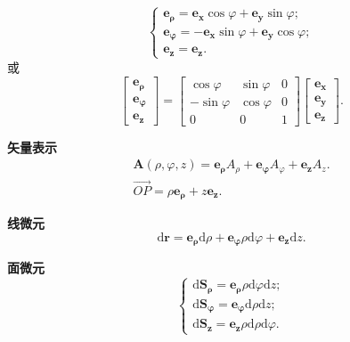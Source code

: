 \begin{equation}
    \begin{cases}
        \bm{e_\rho}=\bm{e_x}\cos\varphi+\bm{e_y}\sin\varphi;     \\
        \bm{e_\varphi}=-\bm{e_x}\sin\varphi+\bm{e_y}\cos\varphi; \\
        \bm{e_z}=\bm{e_z}.
    \end{cases}
\end{equation}
或
\begin{equation}
    \begin{bmatrix}
        \bm{e_\rho}    \\
        \bm{e_\varphi} \\
        \bm{e_z}
    \end{bmatrix}=\begin{bmatrix}
        \cos\varphi  & \sin\varphi & 0 \\
        -\sin\varphi & \cos\varphi & 0 \\
        0            & 0           & 1
    \end{bmatrix}\begin{bmatrix}
        \bm{e_x} \\
        \bm{e_y} \\
        \bm{e_z}
    \end{bmatrix}.
\end{equation}

\textbf{矢量表示}
\begin{gather}
    \bm{A}(\rho, \varphi, z)=\bm{e_\rho}A_\rho+\bm{e_\varphi}A_\varphi+\bm{e_z}A_z. \\
    \overrightarrow{OP}=\rho\bm{e_\rho}+z\bm{e_z}.
\end{gather}

\textbf{线微元}
\begin{equation}
    \mathrm{d}\bm{r}=\bm{e_\rho}\mathrm{d}\rho+\bm{e_\varphi}\rho\mathrm{d}\varphi+\bm{e_z}\mathrm{d}z.
\end{equation}

\textbf{面微元}
\begin{equation}
    \begin{cases}
        \mathrm{d}\bm{S_\rho}=\bm{e_\rho}\rho\mathrm{d}\varphi\mathrm{d}z; \\
        \mathrm{d}\bm{S_\varphi}=\bm{e_\varphi}\mathrm{d}\rho\mathrm{d}z;  \\
        \mathrm{d}\bm{S_z}=\bm{e_z}\rho\mathrm{d}\rho\mathrm{d}\varphi.
    \end{cases}
\end{equation}

